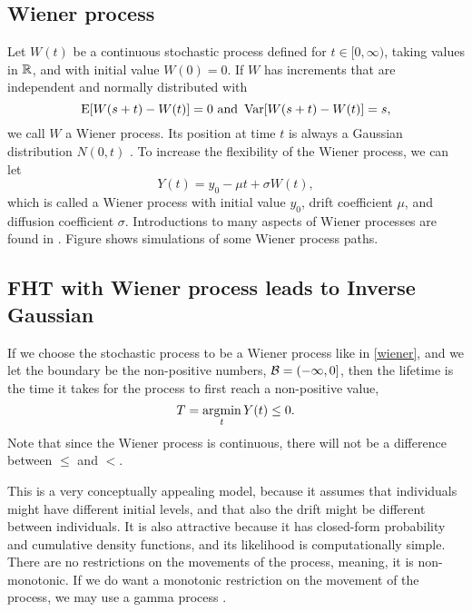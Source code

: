 \subsection{Wiener process}
Let $W(t)$ be a continuous stochastic process defined for $t\in[0,\infty)$, taking values in $\mathbb{R}$, and with initial value $W(0)=0$. If $W$ has increments that are independent and normally distributed with
\begin{equation*}
    \operatorname{E}[W(s+t)-W(t)]=0\text{   and   }\operatorname{Var}[W(s+t)-W(t)]=s,
\end{equation*}
we call $W$ a Wiener process. Its position at time $t$ is always a Gaussian distribution $N(0, t)$ \citep{ABG}. To increase the flexibility of the Wiener process, we can let
\begin{equation}\label{wiener}
    Y(t)=y_0-\mu t+\sigma W(t),
\end{equation}
which is called a Wiener process with initial value $y_0$, drift coefficient $\mu$, and diffusion coefficient $\sigma$. Introductions to many aspects of Wiener processes are found in \citet{cox1965}. Figure  shows simulations of some Wiener process paths.

\subsection{FHT with Wiener process leads to Inverse Gaussian}
If we choose the stochastic process to be a Wiener process like in \eqref{wiener}, and we let the boundary be the non-positive numbers, $\mathcal{B}=(-\infty,0]$, then the lifetime is the time it takes for the process to first reach a non-positive value,
\begin{equation}
    T=\operatorname*{argmin}_{t}Y(t)\leq0.
\end{equation}
Note that since the Wiener process is continuous, there will not be a difference between $\leq$ and $<$.

This is a very conceptually appealing model, because it assumes that individuals might have different initial levels, and that also the drift might be different between individuals. It is also attractive because it has closed-form probability and cumulative density functions, and its likelihood is computationally simple. There are no restrictions on the movements of the process, meaning, it is non-monotonic. If we do want a monotonic restriction on the movement of the process, we may use a gamma process \citep{leewhitmore2006}.

